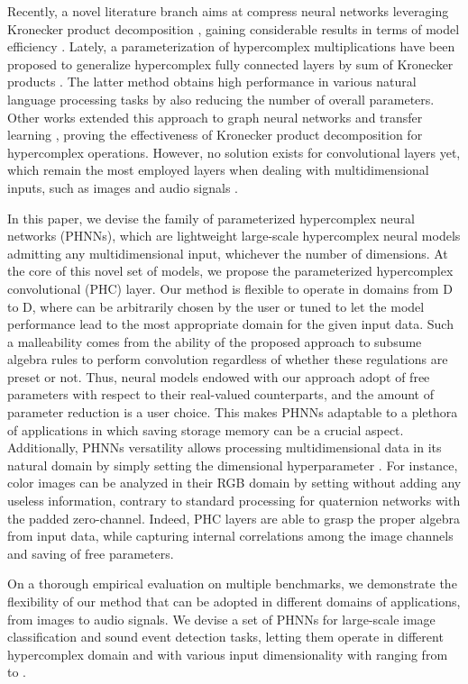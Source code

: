 \documentclass[lettersize,journal]{IEEEtran}
\begin{document}
Recently, a novel literature branch aims at compress neural networks leveraging Kronecker product decomposition \cite{Huang2020StochasticNN, Tang2021SKFAC}, gaining considerable results in terms of model efficiency \cite{Wang2021KroneckerCD}. Lately, a parameterization of hypercomplex multiplications have been proposed to generalize hypercomplex fully connected layers by sum of Kronecker products \cite{Zhang2021PHM}. The latter method obtains high performance in various natural language processing tasks by also reducing the number of overall parameters. Other works extended this approach to graph neural networks \cite{le2021parameterized} and transfer learning \cite{mahabadi2021compacter}, proving the effectiveness of Kronecker product decomposition for hypercomplex operations. However, no solution exists for convolutional layers yet, which remain the most employed layers when dealing with multidimensional inputs, such as images and audio signals \cite{Wu2021CvTIC, Hersheyicassp2017}.

In this paper, we devise the family of parameterized hypercomplex neural networks (PHNNs), which are lightweight large-scale hypercomplex neural models admitting any multidimensional input, whichever the number of dimensions. At the core of this novel set of models, we propose the parameterized hypercomplex convolutional (PHC) layer. Our method is flexible to operate in domains from D to D, where  can be arbitrarily chosen by the user or tuned to let the model performance lead to the most appropriate domain for the given input data. Such a malleability comes from the ability of the proposed approach to subsume algebra rules to perform convolution regardless of whether these regulations are preset or not. Thus, neural models endowed with our approach adopt  of free parameters with respect to their real-valued counterparts, and the amount of parameter reduction is a user choice. This makes PHNNs adaptable to a plethora of applications in which saving storage memory can be a crucial aspect.
Additionally, PHNNs versatility allows processing multidimensional data in its natural domain by simply setting the dimensional hyperparameter . For instance, color images can be analyzed in their RGB domain by setting  without adding any useless information, contrary to standard processing for quaternion networks with the padded zero-channel. Indeed, PHC layers are able to grasp the proper algebra from input data, while capturing internal correlations among the image channels and saving  of free parameters.

On a thorough empirical evaluation on multiple benchmarks, we demonstrate the flexibility of our method that can be adopted in different domains of applications, from images to audio signals.
We devise a set of PHNNs for large-scale image classification and sound event detection tasks, letting them operate in different hypercomplex domain and with various input dimensionality with  ranging from  to .
\end{document}
